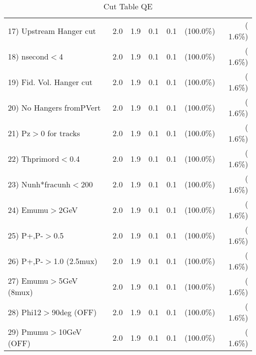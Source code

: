 \begin{table}[h!]
\begin{tabular}{||l||r|r|r|r|r|r||}
 17) Upstream Hanger cut  &          2.0 &          1.9 &          0.1 &          0.1 & (100.0\%) & (  1.6\%) \\
 18) nsecond$<$4          &          2.0 &          1.9 &          0.1 &          0.1 & (100.0\%) & (  1.6\%) \\
 19) Fid. Vol. Hanger cut &          2.0 &          1.9 &          0.1 &          0.1 & (100.0\%) & (  1.6\%) \\
 20) No Hangers fromPVert &          2.0 &          1.9 &          0.1 &          0.1 & (100.0\%) & (  1.6\%) \\
 21) Pz$>$0 for tracks    &          2.0 &          1.9 &          0.1 &          0.1 & (100.0\%) & (  1.6\%) \\
 22) Thprimord$<$0.4      &          2.0 &          1.9 &          0.1 &          0.1 & (100.0\%) & (  1.6\%) \\
 23) Nunh*fracunh$<$200   &          2.0 &          1.9 &          0.1 &          0.1 & (100.0\%) & (  1.6\%) \\
 24) Emumu$>$2GeV         &          2.0 &          1.9 &          0.1 &          0.1 & (100.0\%) & (  1.6\%) \\
 25) P+,P-$>$0.5          &          2.0 &          1.9 &          0.1 &          0.1 & (100.0\%) & (  1.6\%) \\
 26) P+,P-$>$1.0 (2.5mux) &          2.0 &          1.9 &          0.1 &          0.1 & (100.0\%) & (  1.6\%) \\
 27) Emumu$>$5GeV  (8mux) &          2.0 &          1.9 &          0.1 &          0.1 & (100.0\%) & (  1.6\%) \\
 28) Phi12$>$90deg  (OFF) &          2.0 &          1.9 &          0.1 &          0.1 & (100.0\%) & (  1.6\%) \\
 29) Pmumu$>$10GeV  (OFF) &          2.0 &          1.9 &          0.1 &          0.1 & (100.0\%) & (  1.6\%) \\
 \hline
 \hline
 \end{tabular}
 \caption{Cut Table  QE       }
 \label{tab-cutcohjpsi-mumu_qe}
 \end{table}
